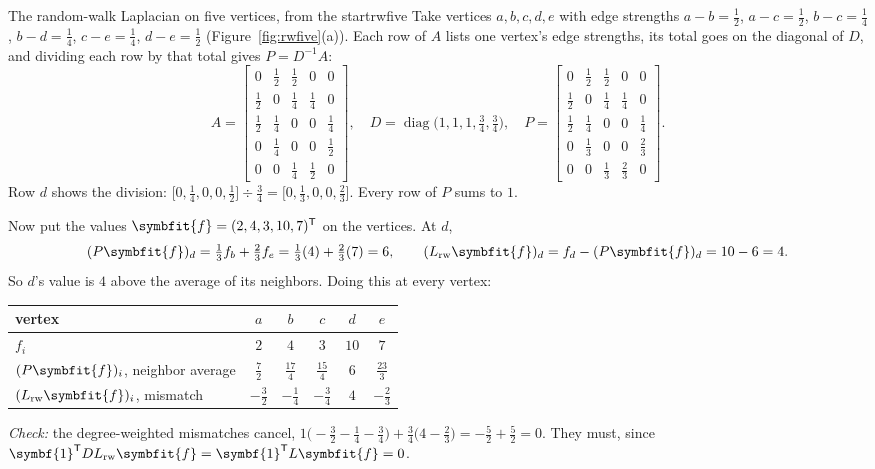 \documentclass[11pt]{article}
\newcommand{\bm}[1]{\symbfit{#1}}
\newcommand{\one}{\symbf{1}}
\newcommand{\T}{^{\mathsf T}}
\newcommand{\diag}{\operatorname{diag}}
\begin{document}
\begin{example}{The random-walk Laplacian on five vertices, from the start}{rwfive}
Take vertices $a,b,c,d,e$ with edge strengths $a{-}b=\tfrac12$, $a{-}c=\tfrac12$, $b{-}c=\tfrac14$, $b{-}d=\tfrac14$, $c{-}e=\tfrac14$, $d{-}e=\tfrac12$ (Figure~\ref{fig:rwfive}(a)). Each row of $A$ lists one vertex's edge strengths, its total goes on the diagonal of $D$, and dividing each row by that total gives $P=D^{-1}A$:
\[
A=\begin{bmatrix}0&\frac12&\frac12&0&0\\\frac12&0&\frac14&\frac14&0\\\frac12&\frac14&0&0&\frac14\\0&\frac14&0&0&\frac12\\0&0&\frac14&\frac12&0\end{bmatrix},
\quad
D=\diag\big(1,1,1,\tfrac34,\tfrac34\big),
\quad
P=\begin{bmatrix}0&\frac12&\frac12&0&0\\\frac12&0&\frac14&\frac14&0\\\frac12&\frac14&0&0&\frac14\\0&\frac13&0&0&\frac23\\0&0&\frac13&\frac23&0\end{bmatrix}.
\]
Row $d$ shows the division: $\big[0,\tfrac14,0,0,\tfrac12\big]\div\tfrac34=\big[0,\tfrac13,0,0,\tfrac23\big]$. Every row of $P$ sums to $1$.

Now put the values $\bm f=(2,4,3,10,7)\T$ on the vertices. At $d$,
\[
(P\bm f)_d=\tfrac13f_b+\tfrac23f_e=\tfrac13(4)+\tfrac23(7)=6,
\qquad
(L_{\mathrm{rw}}\bm f)_d=f_d-(P\bm f)_d=10-6=4 .
\]
So $d$'s value is $4$ above the average of its neighbors. Doing this at every vertex:
\begin{center}
\renewcommand{\arraystretch}{1.25}
\begin{tabular}{lccccc}
\toprule
vertex & $a$ & $b$ & $c$ & $d$ & $e$\\
\midrule
$f_i$ & $2$ & $4$ & $3$ & $10$ & $7$\\
$(P\bm f)_i$, neighbor average & $\tfrac72$ & $\tfrac{17}4$ & $\tfrac{15}4$ & $6$ & $\tfrac{23}3$\\
$(L_{\mathrm{rw}}\bm f)_i$, mismatch & $-\tfrac32$ & $-\tfrac14$ & $-\tfrac34$ & $4$ & $-\tfrac23$\\
\bottomrule
\end{tabular}
\end{center}
\emph{Check:} the degree-weighted mismatches cancel, $1\big({-}\tfrac32-\tfrac14-\tfrac34\big)+\tfrac34\big(4-\tfrac23\big)=-\tfrac52+\tfrac52=0$. They must, since $\one\T DL_{\mathrm{rw}}\bm f=\one\T L\bm f=0$.
\end{example}
\end{document}
